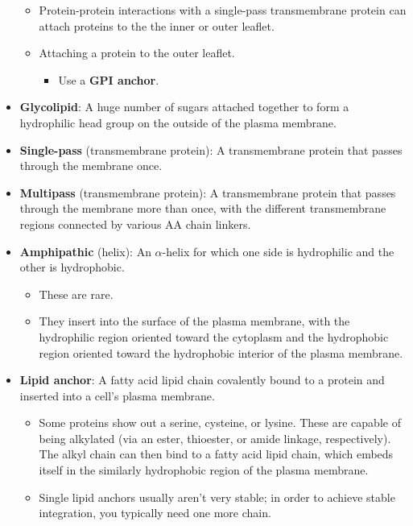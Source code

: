 \documentclass[../notes.tex]{subfiles}
\begin{document}
\begin{itemize}
\begin{itemize}
\begin{itemize}
        \end{itemize}
        \item Protein-protein interactions with a single-pass transmembrane protein can attach proteins to the the inner or outer leaflet.
        \item Attaching a protein to the outer leaflet.
        \begin{itemize}
            \item Use a \textbf{GPI anchor}.
        \end{itemize}
    \end{itemize}
    \item \textbf{Glycolipid}: A huge number of sugars attached together to form a hydrophilic head group on the outside of the plasma membrane.
    \item \textbf{Single-pass} (transmembrane protein): A transmembrane protein that passes through the membrane once.
    \item \textbf{Multipass} (transmembrane protein): A transmembrane protein that passes through the membrane more than once, with the different transmembrane regions connected by various AA chain linkers.
    \item \textbf{Amphipathic} (helix): An $\alpha$-helix for which one side is hydrophilic and the other is hydrophobic.
    \begin{itemize}
        \item These are rare.
        \item They insert into the surface of the plasma membrane, with the hydrophilic region oriented toward the cytoplasm and the hydrophobic region oriented toward the hydrophobic interior of the plasma membrane.
    \end{itemize}
    \item \textbf{Lipid anchor}: A fatty acid lipid chain covalently bound to a protein and inserted into a cell's plasma membrane.
    \begin{itemize}
        \item Some proteins show out a serine, cysteine, or lysine. These are capable of being alkylated (via an ester, thioester, or amide linkage, respectively). The alkyl chain can then bind to a fatty acid lipid chain, which embeds itself in the similarly hydrophobic region of the plasma membrane.
        \item Single lipid anchors usually aren't very stable; in order to achieve stable integration, you typically need one more chain.
    \end{itemize}

\end{itemize}
\end{document}
